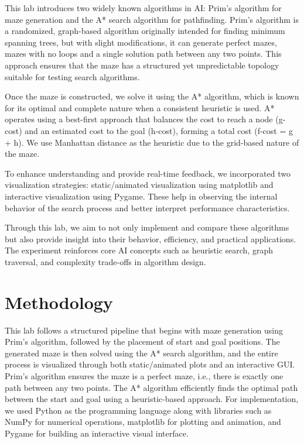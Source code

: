 \documentclass[a4paper, journal]{IEEEtran}
\begin{document}
This lab introduces two widely known algorithms in AI: Prim's algorithm for maze generation and the A* search algorithm for pathfinding. Prim's algorithm is a randomized, graph-based algorithm originally intended for finding minimum spanning trees, but with slight modifications, it can generate perfect mazes, mazes with no loops and a single solution path between any two points. This approach ensures that the maze has a structured yet unpredictable topology suitable for testing search algorithms.

Once the maze is constructed, we solve it using the A* algorithm, which is known for its optimal and complete nature when a consistent heuristic is used. A* operates using a best-first approach that balances the cost to reach a node (g-cost) and an estimated cost to the goal (h-cost), forming a total cost (f-cost = g + h). We use Manhattan distance as the heuristic due to the grid-based nature of the maze.

To enhance understanding and provide real-time feedback, we incorporated two visualization strategies: static/animated visualization using matplotlib and interactive visualization using Pygame. These help in observing the internal behavior of the search process and better interpret performance characteristics.

Through this lab, we aim to not only implement and compare these algorithms but also provide insight into their behavior, efficiency, and practical applications. The experiment reinforces core AI concepts such as heuristic search, graph traversal, and complexity trade-offs in algorithm design.



\section{Methodology}
This lab follows a structured pipeline that begins with maze generation using Prim’s algorithm, followed by the placement of start and goal positions. The generated maze is then solved using the A* search algorithm, and the entire process is visualized through both static/animated plots and an interactive GUI. Prim’s algorithm ensures the maze is a perfect maze, i.e., there is exactly one path between any two points. The A* algorithm efficiently finds the optimal path between the start and goal using a heuristic-based approach. For implementation, we used Python as the programming language along with libraries such as NumPy for numerical operations, matplotlib for plotting and animation, and Pygame for building an interactive visual interface.
\end{document}
